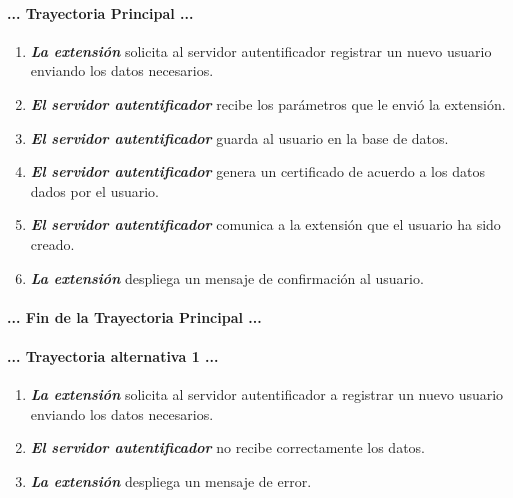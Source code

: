 \documentclass[12pt, a4paper, titlepage]{report}
\begin{document}
    		\paragraph{... Trayectoria Principal ...}
    			\begin{enumerate}
    				\item \textbf{\textit{La extensión}} solicita al  servidor autentificador registrar un nuevo usuario enviando los datos necesarios.
    				
    				\item \textbf{\textit{El servidor autentificador}} recibe los parámetros que le envió la extensión.
    				
    				\item \textbf{\textit{El servidor autentificador }} guarda al usuario en la base de datos.
    				
    				\item \textbf{\textit{El servidor autentificador}} genera un certificado de acuerdo a los datos dados por el usuario.
    				
    				\item \textbf{\textit{El servidor autentificador}} comunica a la extensión que el usuario ha sido creado.
    				
    				\item \textbf{\textit{La extensión}} despliega un mensaje de confirmación al usuario. 
    			\end{enumerate}
    		\paragraph{... Fin de la Trayectoria Principal ...}
		
    		\paragraph{... Trayectoria alternativa 1 ...}
    		\begin{enumerate}
    		    \item \textbf{\textit{La extensión}} solicita al servidor autentificador a registrar un nuevo usuario enviando los datos necesarios.
    		    
    		    \item \textbf{\textit{El servidor autentificador}} no recibe correctamente los datos.
    		    
    		    \item \textbf{\textit{La extensión}} despliega un mensaje de error.
    		\end{enumerate}
\end{document}
